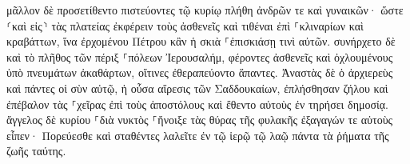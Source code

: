 \documentclass{openreader}
\begin{document}
μᾶλλον δὲ προσετίθεντο πιστεύοντες τῷ κυρίῳ πλήθη ἀνδρῶν τε καὶ γυναικῶν· 
ὥστε ⸂καὶ εἰς⸃ τὰς πλατείας ἐκφέρειν τοὺς ἀσθενεῖς καὶ τιθέναι ἐπὶ ⸀κλιναρίων καὶ κραβάττων, ἵνα ἐρχομένου Πέτρου κἂν ἡ σκιὰ ⸀ἐπισκιάσῃ τινὶ αὐτῶν. 
συνήρχετο δὲ καὶ τὸ πλῆθος τῶν πέριξ ⸀πόλεων Ἰερουσαλήμ, φέροντες ἀσθενεῖς καὶ ὀχλουμένους ὑπὸ πνευμάτων ἀκαθάρτων, οἵτινες ἐθεραπεύοντο ἅπαντες. 
Ἀναστὰς δὲ ὁ ἀρχιερεὺς καὶ πάντες οἱ σὺν αὐτῷ, ἡ οὖσα αἵρεσις τῶν Σαδδουκαίων, ἐπλήσθησαν ζήλου 
καὶ ἐπέβαλον τὰς ⸀χεῖρας ἐπὶ τοὺς ἀποστόλους καὶ ἔθεντο αὐτοὺς ἐν τηρήσει δημοσίᾳ. 
ἄγγελος δὲ κυρίου ⸀διὰ νυκτὸς ⸀ἤνοιξε τὰς θύρας τῆς φυλακῆς ἐξαγαγών τε αὐτοὺς εἶπεν· 
Πορεύεσθε καὶ σταθέντες λαλεῖτε ἐν τῷ ἱερῷ τῷ λαῷ πάντα τὰ ῥήματα τῆς ζωῆς ταύτης. 
\end{document}
